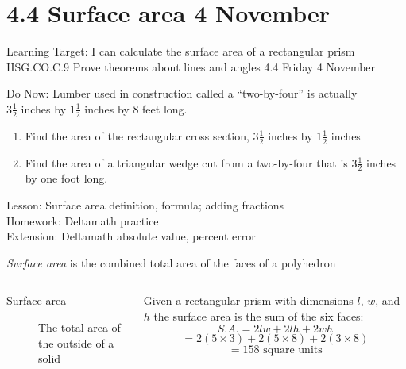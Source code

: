 \documentclass[onlytextwidth, aspectratio=169]{beamer}
\begin{document}
\section{4.4 Surface area \hfill 4 November \,}
  \begin{frame}{Learning Target: I can calculate the surface area of a rectangular prism}
    {HSG.CO.C.9 Prove theorems about lines and angles  \hfill \alert{4.4 Friday 4 November}}
    \begin{block}{Do Now: Lumber used in construction called a ``two-by-four'' is actually \\
      $3 \frac{1}{2}$ inches by $1 \frac{1}{2}$ inches by 8 feet long.}
      \begin{enumerate}
        \item Find the area of the rectangular cross section, $3 \frac{1}{2}$ inches by $1 \frac{1}{2}$ inches
        \item Find the area of a triangular wedge cut from a two-by-four that is $3 \frac{1}{2}$ inches by one foot long.
      \end{enumerate}
    \end{block}
      Lesson: Surface area definition, formula; adding fractions \\
      Homework: Deltamath practice \\
      Extension: Deltamath absolute value, percent error
  \end{frame}

\begin{frame}{\emph{Surface area} is the combined total area of the faces of a polyhedron}
  \begin{columns}
    \begin{description}
      \item[Surface area] The total area of the outside of a solid
    \end{description}
    Given a rectangular prism with dimensions $l$, $w$, and $h$ the surface area is the sum of the six faces:
      $$S.A. = 2lw + 2lh + 2wh$$
      $$ = 2(5 \times 3) + 2(5 \times 8) + 2(3 \times 8)$$
      $$ = 158 \text{ square units} $$
  \end{columns} \vspace{0.5cm}
\end{frame}
\end{document}

